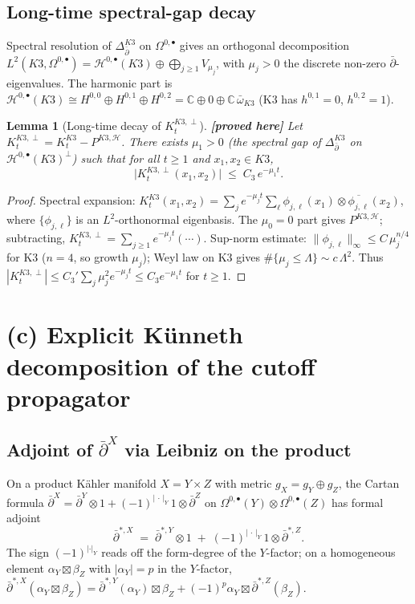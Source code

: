 \documentclass[11pt]{amsart}
\providecommand{\ClaimStatusProvedHere}[1][]{\textbf{[proved here]}}
\providecommand{\dbar}{\bar\partial}
\providecommand{\C}{\mathbb{C}}
\newtheorem{lemma}[theorem]{Lemma}
\theoremstyle{definition}
\theoremstyle{remark}
\begin{document}
\subsection{Long-time spectral-gap decay}

Spectral resolution of $\Delta_{\dbar}^{K3}$ on $\Omega^{0,\bullet}$
gives an orthogonal decomposition
$L^2(K3,\Omega^{0,\bullet}) = \mathcal H^{0,\bullet}(K3) \oplus
\bigoplus_{j\geq 1} V_{\mu_j}$, with $\mu_j > 0$ the discrete
non-zero $\dbar$-eigenvalues. The harmonic part is
$\mathcal H^{0,\bullet}(K3) \cong H^{0,0} \oplus H^{0,1}
\oplus H^{0,2} = \C \oplus 0 \oplus \C\,\bar\omega_{K3}$
(K3 has $h^{0,1}=0$, $h^{0,2}=1$).

\begin{lemma}[Long-time decay of $K^{K3,\perp}_t$]
\label{lem:K3-long-time}
\ClaimStatusProvedHere
Let $K^{K3,\perp}_t = K^{K3}_t - P^{K3,\mathcal H}$. There exists
$\mu_1 > 0$ (the spectral gap of $\Delta_{\dbar}^{K3}$ on
$\mathcal H^{0,\bullet}(K3)^\perp$) such that for all
$t \geq 1$ and $x_1,x_2 \in K3$,
\[
  \bigl|K^{K3,\perp}_t(x_1,x_2)\bigr|
  \;\leq\;
  C_3 \, e^{-\mu_1 t}.
\]
\end{lemma}

\begin{proof}
Spectral expansion: $K^{K3}_t(x_1,x_2) = \sum_j e^{-\mu_j t}
\sum_\ell \phi_{j,\ell}(x_1) \otimes \overline{\phi_{j,\ell}}(x_2)$,
where $\{\phi_{j,\ell}\}$ is an $L^2$-orthonormal eigenbasis. The
$\mu_0 = 0$ part gives $P^{K3,\mathcal H}$; subtracting,
$K^{K3,\perp}_t = \sum_{j \geq 1} e^{-\mu_j t}(\cdots)$.
Sup-norm estimate: $\|\phi_{j,\ell}\|_\infty \leq C\,\mu_j^{n/4}$
for K3 ($n=4$, so growth $\mu_j$); Weyl law on K3 gives
$\#\{\mu_j \leq \Lambda\} \sim c\,\Lambda^2$. Thus
$|K^{K3,\perp}_t| \leq C_3' \sum_j \mu_j^2 e^{-\mu_j t} \leq
C_3 e^{-\mu_1 t}$ for $t \geq 1$.
\end{proof}

\section{(c) Explicit K\"unneth decomposition of the cutoff propagator}
\label{sec:cutoff-propagator}

\subsection{Adjoint of $\dbar^X$ via Leibniz on the product}

On a product K\"ahler manifold $X = Y \times Z$ with metric
$g_X = g_Y \oplus g_Z$, the Cartan formula
$\dbar^X = \dbar^Y \otimes 1 + (-1)^{|\,\cdot\,|_Y}\, 1 \otimes \dbar^Z$
on $\Omega^{0,\bullet}(Y) \otimes \Omega^{0,\bullet}(Z)$ has formal
adjoint
\begin{equation}
  \label{eq:dbar-star-leibniz}
  \dbar^{*,X}
  \;=\;
  \dbar^{*,Y} \otimes 1
  \;+\; (-1)^{|\,\cdot\,|_Y}\, 1 \otimes \dbar^{*,Z}.
\end{equation}
The sign $(-1)^{|\cdot|_Y}$ reads off the form-degree of the
$Y$-factor; on a homogeneous element $\alpha_Y \boxtimes \beta_Z$
with $|\alpha_Y| = p$ in the $Y$-factor,
$\dbar^{*,X}(\alpha_Y \boxtimes \beta_Z) = \dbar^{*,Y}(\alpha_Y)\boxtimes \beta_Z + (-1)^p \alpha_Y \boxtimes \dbar^{*,Z}(\beta_Z)$.
\end{document}
